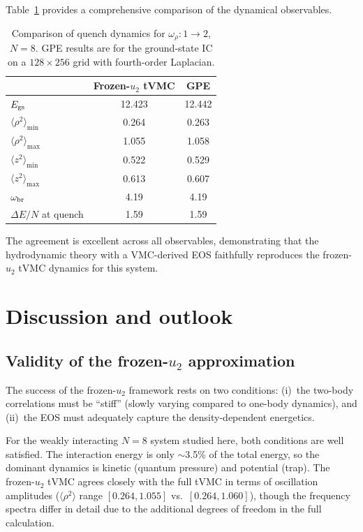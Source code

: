 \documentclass[twocolumn,superscriptaddress,aps,pra,longbibliography]{revtex4-2}
\newcommand{\avg}[1]{\langle #1 \rangle}
\begin{document}
Table~\ref{tab:dynamics} provides a comprehensive comparison of the
dynamical observables.

\begin{table}[t]
\caption{Comparison of quench dynamics for $\omega_\rho: 1\to 2$, $N=8$.
GPE results are for the ground-state IC on a $128\times256$ grid with
fourth-order Laplacian.}
\label{tab:dynamics}
\begin{ruledtabular}
\begin{tabular}{lcc}
& Frozen-$u_2$ tVMC & GPE \\
\hline
$E_{\rm gs}$ & 12.423 & 12.442 \\
$\avg{\rho^2}_{\min}$ & 0.264 & 0.263 \\
$\avg{\rho^2}_{\max}$ & 1.055 & 1.058 \\
$\avg{z^2}_{\min}$ & 0.522 & 0.529 \\
$\avg{z^2}_{\max}$ & 0.613 & 0.607 \\
$\omega_{\rm br}$ & 4.19 & 4.19 \\
$\Delta E/N$ at quench & 1.59 & 1.59 \\
\end{tabular}
\end{ruledtabular}
\end{table}

The agreement is excellent across all observables, demonstrating that
the hydrodynamic theory with a VMC-derived EOS faithfully reproduces
the frozen-$u_2$ tVMC dynamics for this system.

\section{Discussion and outlook}
\label{sec:discussion}

\subsection{Validity of the frozen-$u_2$ approximation}

The success of the frozen-$u_2$ framework rests on two conditions:
(i)~the two-body correlations must be ``stiff'' (slowly varying compared
to one-body dynamics), and (ii)~the EOS must adequately capture the
density-dependent energetics.

For the weakly interacting $N=8$ system studied here, both conditions are
well satisfied.  The interaction energy is only $\sim$3.5\% of the total
energy, so the dominant dynamics is kinetic (quantum pressure) and
potential (trap).  The frozen-$u_2$ tVMC agrees closely with the full
tVMC in terms of oscillation amplitudes ($\avg{\rho^2}$ range
$[0.264, 1.055]$ vs.\ $[0.264, 1.060]$), though the frequency spectra
differ in detail due to the additional degrees of freedom in the full
calculation.
\end{document}
